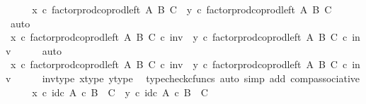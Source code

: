 \begin{isabellebody}
\ \ \isamarkupfalse%
\ \isamarkupfalse%
\ {\isachardoublequoteopen}x\ {\isasymcirc}\isactrlsub c\ factor{\isacharunderscore}{\kern0pt}prod{\isacharunderscore}{\kern0pt}coprod{\isacharunderscore}{\kern0pt}left\ A\ B\ C\ {\isacharequal}{\kern0pt}\ y\ {\isasymcirc}\isactrlsub c\ factor{\isacharunderscore}{\kern0pt}prod{\isacharunderscore}{\kern0pt}coprod{\isacharunderscore}{\kern0pt}left\ A\ B\ C{\isachardoublequoteclose}\isanewline
\ \ \ \ \isamarkupfalse%
\ auto\isanewline
\ \ \isamarkupfalse%
\ \isamarkupfalse%
\ {\isachardoublequoteopen}{\isacharparenleft}{\kern0pt}x\ {\isasymcirc}\isactrlsub c\ factor{\isacharunderscore}{\kern0pt}prod{\isacharunderscore}{\kern0pt}coprod{\isacharunderscore}{\kern0pt}left\ A\ B\ C{\isacharparenright}{\kern0pt}\ {\isasymcirc}\isactrlsub c\ inv\ {\isacharequal}{\kern0pt}\ {\isacharparenleft}{\kern0pt}y\ {\isasymcirc}\isactrlsub c\ factor{\isacharunderscore}{\kern0pt}prod{\isacharunderscore}{\kern0pt}coprod{\isacharunderscore}{\kern0pt}left\ A\ B\ C{\isacharparenright}{\kern0pt}\ {\isasymcirc}\isactrlsub c\ inv{\isachardoublequoteclose}\isanewline
\ \ \ \ \isamarkupfalse%
\ auto\isanewline
\ \ \isamarkupfalse%
\ \isamarkupfalse%
\ {\isachardoublequoteopen}x\ {\isasymcirc}\isactrlsub c\ factor{\isacharunderscore}{\kern0pt}prod{\isacharunderscore}{\kern0pt}coprod{\isacharunderscore}{\kern0pt}left\ A\ B\ C\ {\isasymcirc}\isactrlsub c\ inv\ {\isacharequal}{\kern0pt}\ y\ {\isasymcirc}\isactrlsub c\ factor{\isacharunderscore}{\kern0pt}prod{\isacharunderscore}{\kern0pt}coprod{\isacharunderscore}{\kern0pt}left\ A\ B\ C\ {\isasymcirc}\isactrlsub c\ inv{\isachardoublequoteclose}\isanewline
\ \ \ \ \isamarkupfalse%
\ inv{\isacharunderscore}{\kern0pt}type\ x{\isacharunderscore}{\kern0pt}type\ y{\isacharunderscore}{\kern0pt}type\ \isamarkupfalse%
\ {\isacharparenleft}{\kern0pt}typecheck{\isacharunderscore}{\kern0pt}cfuncs{\isacharcomma}{\kern0pt}\ auto\ simp\ add{\isacharcolon}{\kern0pt}\ comp{\isacharunderscore}{\kern0pt}associative{}{\isacharparenright}{\kern0pt}\isanewline
\ \ \isamarkupfalse%
\ \isamarkupfalse%
\ {\isachardoublequoteopen}x\ {\isasymcirc}\isactrlsub c\ id\isactrlsub c\ {\isacharparenleft}{\kern0pt}A\ {\isasymtimes}\isactrlsub c\ B\ {\isasymCoprod}\ C{\isacharparenright}{\kern0pt}\ {\isacharequal}{\kern0pt}\ y\ {\isasymcirc}\isactrlsub c\ id\isactrlsub c\ {\isacharparenleft}{\kern0pt}A\ {\isasymtimes}\isactrlsub c\ B\ {\isasymCoprod}\ C{\isacharparenright}{\kern0pt}{\isachardoublequoteclose}\isanewline

\end{isabellebody}
